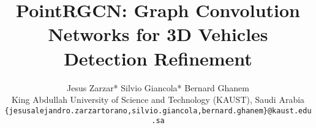 \documentclass[10pt,twocolumn,letterpaper]{article}
\begin{document}
\title{PointRGCN: Graph Convolution Networks for 3D Vehicles Detection Refinement}



\author{Jesus Zarzar* Silvio Giancola* Bernard Ghanem\\
	King Abdullah University of Science and Technology (KAUST), Saudi Arabia \\
	{\tt\small \{jesusalejandro.zarzartorano,silvio.giancola,bernard.ghanem\}@kaust.edu.sa}
}

\maketitle



\newcommand{\mysection}[1]{\vspace{3pt}\noindent\textbf{#1}}
\newcommand{\TODO}[1]{\textcolor{red}{\textbf{\textit{[TODO] #1}}}}
\newcommand{\BG}[1]{\textcolor{red}{\textbf{\textit{[BG] #1}}}}
\newcommand{\JZ}[1]{\textcolor{red}{\textbf{\textit{[JZ] #1}}}}
\newcommand{\SG}[1]{\textcolor{red}{\textbf{\textit{[SG] #1}}}}
\newcommand{\sota}{state-of-the-art\xspace}
\newcommand{\Sota}{State-of-the-art\xspace}
\newcommand{\Table}[1]{Table~\ref{tab:#1}}
\newcommand{\Figure}[1]{Figure~\ref{fig:#1}}
\newcommand{\Equation}[1]{Equation~\eqref{eq:#1}}
\newcommand{\Section}[1]{Section~\ref{sec:#1}}
\newcommand{\job}[1]{\textcolor{red}{\textbf{\textit{[job-id] #1}}}}
\newcommand{\MRGCN}{MRGCN~\cite{li2019deepgcns_journal}\xspace}
\newcommand{\MR}{MRGCN~\cite{li2019deepgcns_journal}\xspace}
\newcommand{\EdgeConv}{EdgeConv~\cite{wang2019dynamic}\xspace}

\newcommand{\MVD}{MV3D~\cite{chen2017multi}\xspace}
\newcommand{\AVODFPN}{AVOD-FPN~\cite{ku2018joint}\xspace}
\newcommand{\AVOD}{AVOD~\cite{ku2018joint}\xspace}
\newcommand{\UberMMF}{UberATG-MMF~\cite{liang2019multi}\xspace}
\newcommand{\FPointNet}{F-PointNet~\cite{qi2018frustum}\xspace}
\newcommand{\VoxelNet}{VoxelNet~\cite{zhou2018voxelnet}\xspace}
\newcommand{\PIXOR}{PIXOR~\cite{yang2018pixor}\xspace}
\newcommand{\SECOND}{SECOND~\cite{yan2018second}\xspace}
\newcommand{\PointPillars}{PointPillars~\cite{lang2019pointpillars}\xspace}
\newcommand{\PointRCNN}{PointRCNN~\cite{shi2019pointrcnn}\xspace}
\newcommand{\FastPointRCNN}{Fast Point R-CNN~\cite{Chen2019FastPointRCNN}\xspace}
\newcommand{\STD}{STD~\cite{Yang2019std}\xspace}
\newcommand{\VoxelFPN}{Voxel-FPN~\cite{wang2019voxel}\xspace}
\newcommand{\PartA}{Part-$A^2$~\cite{shi2019part}\xspace}
\newcommand{\Patch}{Patch~\cite{lehner2019patch}\xspace}
\end{document}
